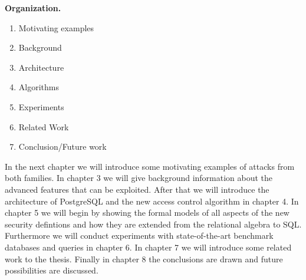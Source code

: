 \smallskip
\noindent
{\bf Organization.}
\begin{enumerate}
	\item Motivating examples
	\item Background
	\item Architecture
	\item Algorithms
	\item Experiments
	\item Related Work
	\item Conclusion/Future work
\end{enumerate}
In the next chapter we will introduce some motivating examples of attacks from both families. 
%
In chapter 3 we will give background information about the advanced features that can be exploited. 
%
After that we will introduce the architecture of PostgreSQL and the new access control algorithm in chapter 4. 
%
In chapter 5 we will begin by showing the formal models of all aspects of the new security defintions and how they are extended from the relational algebra to SQL. 
%
Furthermore we will conduct experiments with state-of-the-art benchmark databases and queries in chapter 6. 
%
In chapter 7 we will introduce some related work to the thesis. 
%
Finally in chapter 8 the conclusions are drawn and future possibilities are discussed.
